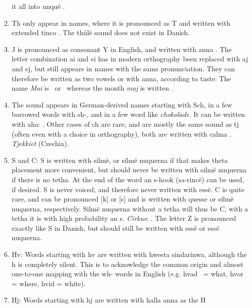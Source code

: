 \documentclass[a4paper]{article}
\begin{document}
\begin{enumerate}
  it all into unqu\"e \Tunque.\label{noteG}
\item Th only appear in names, where it is pronounced as T and written
  with extended tinco \Textendedtinco.  The th\'ul\"e sound
  \textipa{[T]} does not exist in Danish.\label{noteTH}
\item J is pronounced as consonant Y in English, and written with anna
  \Tanna.  The letter combination ai and ei has in modern orthography
  been replaced with aj and ej, but still appears in names with the
  same pronunciation.  They can therefore be written as two vowels or
  with anna, according to taste: The name \emph{Mai} is
  \Tmalta\Ttelco\TTthreedots\Ttelco\TTdot ~or \Tmalta\Tanna\TTdot
  ~whereas the month \emph{maj} is written
  \Tmalta\Tanna\TTdot.\label{noteJ}
\item The sound \textipa{[S]} appears in German-derived names starting
  with Sch, in a few borrowed words with sh-, and in a few word like
  \emph{chokolade}.  It can be written with aha:
  \Taha\Tquesse\TTrightcurl\Tlambe\TTrightcurl\Tanto\TTthreedots\TTdotbelow.
  Other cases of ch are rare, and are mostly the same sound as tj
  \textipa{[tS]} (often even with a choice in orthography), both are
  written with calma \Tcalma.\label{noteAhaCalma}  \emph{Tjekkiet}
  \Tcalma\Tquesse\TTacute\TTdoubler\Ttelco\TTdot\Ttinco\TTacute\Ts (Czechia).
\item S and C: S is written with silm\"e, or silm\"e nuquerna if that
  makes theta placement more convenient, but should never be written
  with silm\"e nuquerna if there is no tetha. At the end of the word
  an s-hook (sa-rinc\"e) can be used, if desired. S is never voiced,
  and therefore never written with ess\"e.  C is quite rare, and
  can be pronounced [k] or [s] and is written with quesse or silm\"e
  nuquerna, respectively.  Silm\"e nuquerna without a tetha will thus
  be C, with a tetha it is with high probability an s.  \emph{Cirkus}:
  \Tsilmenuquerna\Toore\TTdot\Tquesse\Tsilmenuquerna\TTrightcurl.\label{noteCS}
  The letter Z is pronounced exactly like S in Danish, but should still
  be written with ess\"e or ess\"e nuquerna.
\item Hv: Words starting with hv are written with hwesta sindarinwa,
  although the h is completely silent.  This is to acknowledge the
  common origin and almost one-to-one mapping with the wh- words in
  English (e.g. hvad \Thwestasindarinwa\Tanto\TTthreedots ~= what,
  hvor  = where, hvid = white).\label{noteHv}
\item Hj: Words starting with hj are written with halla anna as the H

\end{enumerate}
\end{document}
